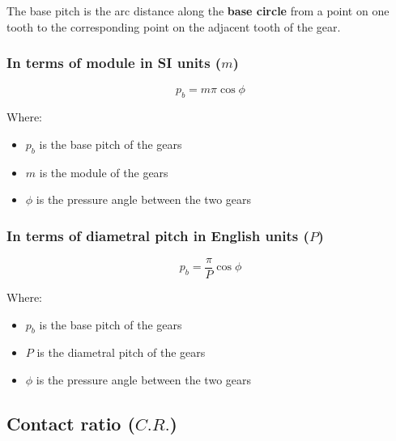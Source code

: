 \documentclass[11pt]{article}
\begin{document}
The base pitch is the arc distance along the \textbf{base circle} from a point on one tooth to the corresponding point on the adjacent tooth of the gear.
\subsubsection{In terms of module in SI units (\(m\))}
\label{sec:org9df7c7c}
\[p_b = m \pi \cos \phi\]

Where:
\begin{itemize}
\item \(p_b\) is the base pitch of the gears
\item \(m\) is the module of the gears
\item \(\phi\) is the pressure angle between the two gears
\end{itemize}

 \newpage
\subsubsection{In terms of diametral pitch in English units (\(P\))}
\label{sec:orgd3d3d2e}
\[p_b = \frac{\pi}{P} \cos \phi\]

Where:
\begin{itemize}
\item \(p_b\) is the base pitch of the gears
\item \(P\) is the diametral pitch of the gears
\item \(\phi\) is the pressure angle between the two gears
\end{itemize}
\subsection{Contact ratio (\(C.R.\))}
\label{sec:org706b17c}
\end{document}

